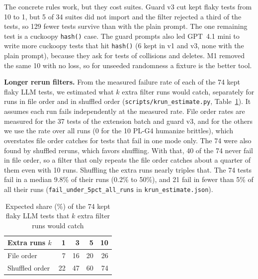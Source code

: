 \documentclass[sigconf,nonacm]{acmart}
\begin{document}
The concrete rules work, but they cost suites. Guard v3 cut kept flaky tests from 10 to 1, but 5 of 34 suites did not import and the filter rejected a third of the tests, so 129 fewer tests survive than with the plain prompt. The one remaining test is a cuckoopy \texttt{hash()} case. The guard prompts also led GPT~4.1 mini to write more cuckoopy tests that hit \texttt{hash()} (6 kept in v1 and v3, none with the plain prompt), because they ask for tests of collisions and deletes. M1 removed the same 10 with no loss, so for unseeded randomness a fixture is the better tool.

\textbf{Longer rerun filters.} From the measured failure rate of each of the 74 kept flaky LLM tests, we estimated what $k$ extra filter runs would catch, separately for runs in file order and in shuffled order (\texttt{scripts/krun\_estimate.py}, Table~\ref{tab:krun}). It assumes each run fails independently at the measured rate. File order rates are measured for the 37 tests of the extension batch and guard v3, and for the others we use the rate over all runs (0 for the 10 PL-G4 humanize brittles), which overstates file order catches for tests that fail in one mode only. The 74 were also found by shuffled reruns, which favors shuffling. With that, 40 of the 74 never fail in file order, so a filter that only repeats the file order catches about a quarter of them even with 10 runs. Shuffling the extra runs nearly triples that. The 74 tests fail in a median 9.8\% of their runs (0.2\% to 50\%), and 21 fail in fewer than 5\% of all their runs (\texttt{fail\_under\_5pct\_all\_runs} in \texttt{krun\_estimate.json}).

\begin{table}[h]
\caption{Expected share (\%) of the 74 kept flaky LLM tests that $k$ extra filter runs would catch}
\label{tab:krun}
\small
\begin{tabular}{lrrrr}
\toprule
Extra runs $k$ & 1 & 3 & 5 & 10 \\
\midrule
File order & 7 & 16 & 20 & 26 \\
Shuffled order & 22 & 47 & 60 & 74 \\
\bottomrule
\end{tabular}
\end{table}
\end{document}
